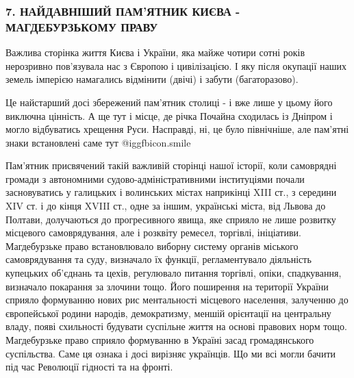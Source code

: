 
 
 
 
 

\subsubsection{7. НАЙДАВНІШИЙ ПАМ'ЯТНИК КИЄВА - МАГДЕБУРЗЬКОМУ ПРАВУ}
\label{sec:28_01_2022.fb.fb_group.story_kiev_ua.1.kiev_visim_sekretiv.7.pamjatnik_magdeburg_prava}

Важлива сторінка життя Києва і України, яка майже чотири сотні років нерозривно
пов’язувала нас з Європою і цивілізацією. І яку після окупації наших земель
імперією намагались відмінити (двічі) і забути (багаторазово). 


Це найстарший досі збережений пам’ятник столиці - і вже лише у цьому його
виключна цінність. А ще тут і місце, де річка Почайна сходилась із Дніпром і
могло відбуватись хрещення Руси. Насправді, ні, це було північніше, але
пам’ятні знаки встановлені саме тут  @igg{fbicon.smile}   

Пам’ятник присвячений такій важливій сторінці нашої історії, коли самоврядні
громади з автономними судово-адміністративними інституціями почали
засновуватись у галицьких і волинських містах наприкінці XIII ст., з середини
XIV ст. і до кінця XVIII ст., одне за іншим, українські міста, від Львова до
Полтави, долучаються до прогресивного явища, яке сприяло не лише розвитку
місцевого самоврядування, але і розквіту ремесел, торгівлі, ініціативи.
Магдебурзьке право встановлювало виборну систему органів міського
самоврядування та суду, визначало їх функції, регламентувало діяльність
купецьких об'єднань та цехів, регулювало питання торгівлі, опіки, спадкування,
визначало покарання за злочини тощо. Його поширення на території України
сприяло формуванню нових рис ментальності місцевого населення, залученню до
європейської родини народів, демократизму, меншій орієнтації на центральну
владу, появі схильності будувати суспільне життя на основі правових норм тощо.
Магдебурзьке право сприяло формуванню в Україні засад громадянського
суспільства. Саме ця ознака і досі вирізняє українців. Що ми всі могли бачити
під час Революції гідності та на фронті.

